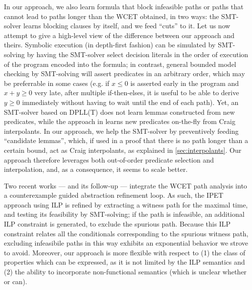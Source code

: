 \documentclass[a4paper,twocolumn,11pt]{article}
\begin{document}
In our approach, we also learn formula that block infeasible paths or paths that cannot lead to paths longer than the WCET obtained, in two ways: the SMT-solver learns blocking clauses by itself, and we feed ``cuts'' to it.
Let us now attempt to give a high-level view of the difference between our approach and theirs.
Symbolic execution \parencite{Cadar:2013:SES:2408776.2408795} (in depth-first fashion) can be simulated by SMT-solving by having the SMT-solver select decision literals \parencite{Kroening_Strichman} in the order of execution of the program encoded into the formula;
in contrast, general bounded model checking by SMT-solving will assert predicates in an arbitrary order, which may be preferrable in some cases (e.g. if $x \leq 0$ is asserted early in the program and $x + y \geq 0$ very late, after multiple if-then-elses, it is useful to be able to derive $y \geq 0$ immediately without having to wait until the end of each path).
Yet, an SMT-solver based on DPLL(T) does not learn lemmas constructed from new predicates, while the approach in \parencite{Chu_Jaffar_EMSOFT2011} learns new predicates on-the-fly from Craig interpolants.
In our approach, we help the SMT-solver by preventively feeding ``candidate lemmas'', which, if used in a proof that there is no path longer than a certain bound, act as Craig interpolants, as explained in \autoref{sec:interpolants}.
Our approach therefore leverages both out-of-order predicate selection and interpolation, and, as a consequence, it seems to scale better. 
\smallskip

Two recent works --- \textcite{Biere_et_al_WCET2013} and its follow-up \textcite{DBLP:conf/rtns/KnoopKZ13} --- integrate the WCET path analysis into a counterexample guided abstraction refinement loop. 
As such, the IPET approach using ILP is refined by extracting a witness path for the maximal time, and testing its feasibility by SMT-solving; if the path is infeasible, an additional ILP constraint is generated, to exclude the spurious path. Because this ILP constraint relates all the conditionals corresponding to the spurious witness path, excluding infeasibile paths in this way exhibits an exponential behavior we strove to avoid. Moreover, our approach is more flexible with respect to (1) the class of properties which can be expressed, as it is not limited by the ILP semantics and (2) the ability to incorporate non-functional semantics (which is unclear whether \parencite{Biere_et_al_WCET2013} or \parencite{DBLP:conf/rtns/KnoopKZ13} can).
\end{document}
